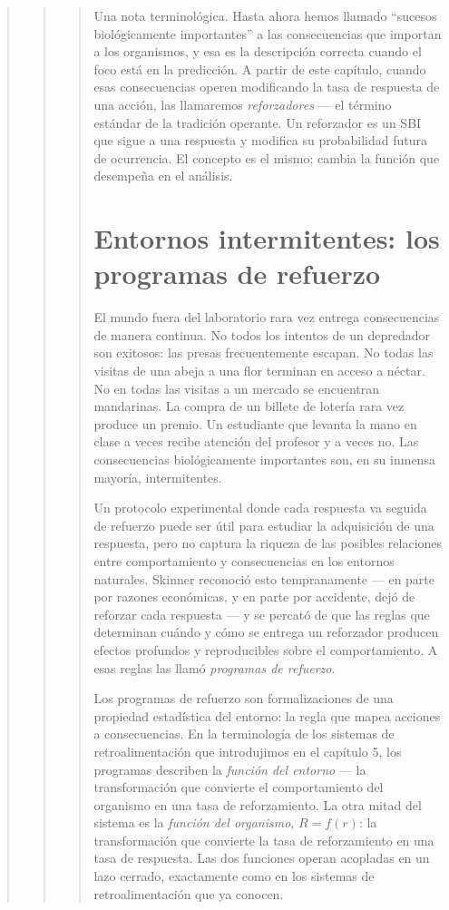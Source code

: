 \documentclass[
  letterpaper,
  DIV=11,
  numbers=noendperiod]{scrreprt}
\begin{document}
\begin{tcolorbox}[enhanced jigsaw, toprule=.15mm, arc=.35mm, colback=white, opacityback=0, colframe=quarto-callout-note-color-frame, breakable, rightrule=.15mm, left=2mm, leftrule=.75mm, bottomrule=.15mm]
\begin{quote}
\begin{quote}
\begin{quote}
Una nota terminológica. Hasta ahora hemos llamado ``sucesos
biológicamente importantes'' a las consecuencias que importan a los
organismos, y esa es la descripción correcta cuando el foco está en la
predicción. A partir de este capítulo, cuando esas consecuencias operen
modificando la tasa de respuesta de una acción, las llamaremos
\emph{reforzadores} --- el término estándar de la tradición operante. Un
reforzador es un SBI que sigue a una respuesta y modifica su
probabilidad futura de ocurrencia. El concepto es el mismo; cambia la
función que desempeña en el análisis.

\section{Entornos intermitentes: los programas de
refuerzo}\label{entornos-intermitentes-los-programas-de-refuerzo}

El mundo fuera del laboratorio rara vez entrega consecuencias de manera
continua. No todos los intentos de un depredador son exitosos: las
presas frecuentemente escapan. No todas las visitas de una abeja a una
flor terminan en acceso a néctar. No en todas las visitas a un mercado
se encuentran mandarinas. La compra de un billete de lotería rara vez
produce un premio. Un estudiante que levanta la mano en clase a veces
recibe atención del profesor y a veces no. Las consecuencias
biológicamente importantes son, en su inmensa mayoría, intermitentes.

Un protocolo experimental donde cada respuesta va seguida de refuerzo
puede ser útil para estudiar la adquisición de una respuesta, pero no
captura la riqueza de las posibles relaciones entre comportamiento y
consecuencias en los entornos naturales. Skinner reconoció esto
tempranamente --- en parte por razones económicas, y en parte por
accidente, dejó de reforzar cada respuesta --- y se percató de que las
reglas que determinan cuándo y cómo se entrega un reforzador producen
efectos profundos y reproducibles sobre el comportamiento. A esas reglas
las llamó \emph{programas de refuerzo}.

Los programas de refuerzo son formalizaciones de una propiedad
estadística del entorno: la regla que mapea acciones a consecuencias. En
la terminología de los sistemas de retroalimentación que introdujimos en
el capítulo 5, los programas describen la \emph{función del entorno} ---
la transformación que convierte el comportamiento del organismo en una
tasa de reforzamiento. La otra mitad del sistema es la \emph{función del
organismo}, \(R = f(r)\): la transformación que convierte la tasa de
reforzamiento en una tasa de respuesta. Las dos funciones operan
acopladas en un lazo cerrado, exactamente como en los sistemas de
retroalimentación que ya conocen.


\end{quote}
\end{quote}
\end{quote}
\end{tcolorbox}
\end{document}
